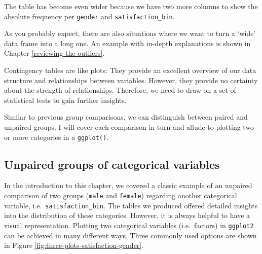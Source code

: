 \documentclass[
]{book}
\begin{document}
The table has become even wider because we have two more columns to show the absolute frequency per \texttt{gender} and \texttt{satisfaction\_bin}.

As you probably expect, there are also situations where we want to turn a `wide' data frame into a long one. An example with in-depth explanations is shown in Chapter \ref{reviewing-the-outliers}.

Contingency tables are like plots: They provide an excellent overview of our data structure and relationships between variables. However, they provide no certainty about the strength of relationships. Therefore, we need to draw on a set of statistical tests to gain further insights.

Similar to previous group comparisons, we can distinguish between paired and unpaired groups. I will cover each comparison in turn and allude to plotting two or more categories in a \texttt{ggplot()}.

\hypertarget{unpaired-groups-categorical-variables}{%
\subsection{Unpaired groups of categorical variables}\label{unpaired-groups-categorical-variables}}

In the introduction to this chapter, we covered a classic example of an unpaired comparison of two groups (\texttt{male} and \texttt{female}) regarding another categorical variable, i.e.~\texttt{satisfaction\_bin}. The tables we produced offered detailed insights into the distribution of these categories. However, it is always helpful to have a visual representation. Plotting two categorical variables (i.e.~factors) in \texttt{ggplot2} can be achieved in many different ways. Three commonly used options are shown in Figure \ref{fig:three-plots-satisfaction-gender}.
\end{document}
